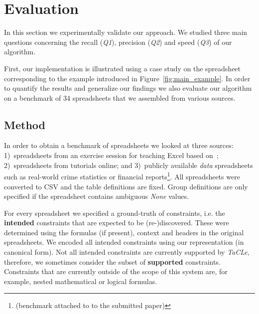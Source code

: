 \documentclass{IEEEtran}
\newcommand{\sergey}[1]{\textcolor{magenta}{{\sc Sergey:} #1}\xspace}
\newcommand{\samuel}[1]{\textcolor{green}{{\sc Samuel:} #1}\xspace}
\newcommand{\format}[1]{\textit{#1}\xspace}
\newcommand{\sname}{\format{TaCLe}}
\theoremstyle{definition}
\begin{document}

\newcommand{\runtotal}{16.12}
\newcommand{\runtotalstd}{0.62}

\newcommand{\runfile}{0.50}
\newcommand{\runfilestd}{0.02}

\newcommand{\benchsize}{??}

\section{Evaluation}\label{sec:evaluation}
In this section we experimentally validate our approach.
We studied three main questions concerning the recall (\textit{Q1}), precision (\textit{Q2}) and speed (\textit{Q3}) of our algorithm.

First, our implementation is illustrated using a case study on the spreadsheet corresponding to the example introduced in Figure~\ref{fig:main_example}.
In order to quantify the results and generalize our findings we also evaluate our algorithm on a benchmark of 34 spreadsheets that we assembled from various sources.

\subsection{Method}
\label{sec:evalualtion:method}
In order to obtain a benchmark of spreadsheets we looked at three sources:
1)~spreadsheets from an exercise session for teaching Excel based on~\cite{excel_book}; 2)~spreadsheets from tutorials online; and 3)~publicly available \textit{data} spreadsheets such as real-world crime statistics or financial reports\footnote{(benchmark attached to to the submitted paper)}.
All spreadsheets were converted to CSV and the table definitions are fixed.
Group definitions are only specified if the spreadsheet contains ambiguous \textit{None} values. 

For every spreadsheet we specified a ground-truth of constraints, i.e. the \textbf{intended} constraints that are expected to be (re-)discovered.
These were determined using the formulas (if present), context and headers in the original spreadsheets.
We encoded all intended constraints using our representation (in canonical form).
Not all intended constraints are currently supported by \sname, therefore, we sometimes consider the subset of \textbf{supported} constraints.
Constraints that are currently outside of the scope of this system are, for example, nested mathematical or logical formulas.
\end{document}
